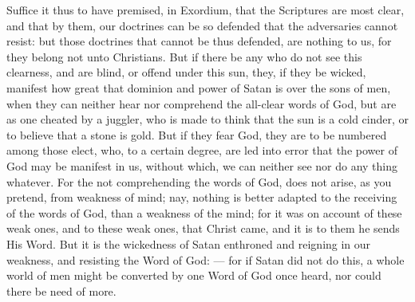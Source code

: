 Suffice it thus to have premised, in Exordium, that the Scriptures are most clear, and that by them, our doctrines can be so defended that the adversaries cannot resist: but those doctrines that cannot be thus defended, are nothing to us, for they belong not unto Christians. But if there be any who do not see this clearness, and are blind, or offend under this sun, they, if they be wicked, manifest how great that dominion and power of Satan is over the sons of men, when they can neither hear nor comprehend the all-clear words of God, but are as one cheated by a juggler, who is made to think that the sun is a cold cinder, or to believe that a stone is gold. But if they fear God, they are to be numbered among those elect, who, to a certain degree, are led into error that the power of God may be manifest in us, without which, we can neither see nor do any thing whatever. For the not comprehending the words of God, does not arise, as you pretend, from weakness of mind; nay, nothing is better adapted to the receiving of the words of God, than a weakness of the mind; for it was on account of these weak ones, and to these weak ones, that Christ came, and it is to them he sends His Word. But it is the wickedness of Satan enthroned and reigning in our weakness, and resisting the Word of God: — for if Satan did not do this, a whole world of men might be converted by one Word of God once heard, nor could there be need of more.



